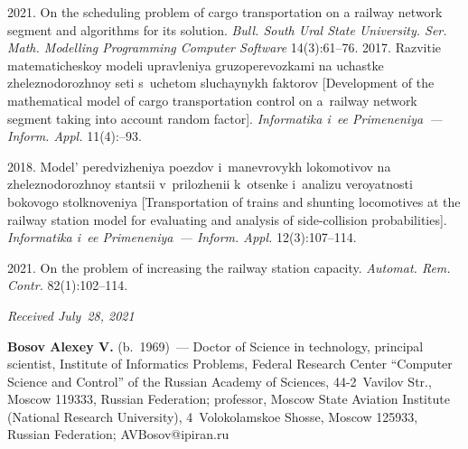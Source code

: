 \begin{multicols}{2}
{{\begin{thebibliography}{99}
 2021. On the scheduling problem of cargo transportation on a railway 
network segment and algorithms for its solution. \textit{Bull. South Ural State University. Ser. Math. 
Modelling Programming Computer Software} 14(3):61--76.
 2017. Razvitie 
matematicheskoy modeli upravleniya gruzoperevozkami na uchastke zheleznodorozhnoy seti 
s~uchetom sluchaynykh faktorov [Development of the mathematical model of cargo transportation 
control on a~railway network segment taking into account random factor]. \textit{Informatika i~ee 
Primeneniya~--- Inform. \mbox{Appl.}} 11(4):--93.

 2018. Mo\-del' peredvizheniya po\-ez\-dov 
i~manevrovykh lo\-ko\-mo\-ti\-vov na zheleznodorozhnoy stantsii v~pri\-lo\-zhe\-nii k~otsen\-ke i~ana\-li\-zu 
veroyatnosti bokovogo stolknoveniya [Transportation of trains and shunting locomotives at the railway
station model for evaluating and analysis of side-collision probabilities]. \textit{Informatika i~ee 
Primeneniya~--- Inform. \mbox{Appl.}} 12(3):107--114.

 2021. On the problem of increasing the railway station 
capacity. \textit{Automat. Rem. Contr.} 82(1):102--114.
\end{thebibliography}

 }
 }

\end{multicols}

\vspace*{-3pt}

  \hfill{\small\textit{Received July~28, 2021}}




\Contr

\noindent
\textbf{Bosov Alexey V.} (b.\ 1969)~--- Doctor of Science in technology, principal scientist, Institute 
of Informatics Problems, Federal Research Center ``Computer Science and Control'' of the Russian 
Academy of Sciences, 44-2~Vavilov Str., Moscow 119333, Russian Federation; professor, Moscow 
State Aviation Institute (National Research University), 4~Volokolamskoe Shosse, Moscow 125933, 
Russian Federation; \mbox{AVBosov@ipiran.ru}


